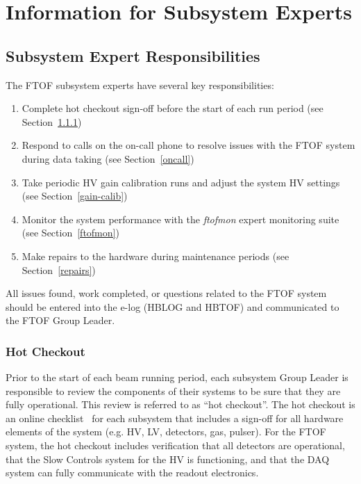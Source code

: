 \documentclass[12pt]{article}
\begin{document}
\clearpage

\vfil
\eject

\section{Information for Subsystem Experts}

\subsection{Subsystem Expert Responsibilities}

The FTOF subsystem experts have several key responsibilities:

\begin{enumerate}
\item Complete hot checkout sign-off before the start of each run period (see 
Section~\ref{checkout})
\item Respond to calls on the on-call phone to resolve issues with the FTOF system 
during data taking (see Section~\ref{oncall})
\item Take periodic HV gain calibration runs and adjust the system HV settings (see 
Section~\ref{gain-calib})
\item Monitor the system performance with the {\it ftofmon} expert monitoring suite
(see Section~\ref{ftofmon})
\item Make repairs to the hardware during maintenance periods (see Section~\ref{repairs})
\end{enumerate}

All issues found, work completed, or questions related to the FTOF system should be 
entered into the e-log (HBLOG and HBTOF) and communicated to the FTOF Group Leader.

\subsubsection{Hot Checkout}
\label{checkout}

Prior to the start of each beam running period, each subsystem Group Leader is 
responsible to review the components of their systems to be sure that they are fully 
operational. This review is referred to as ``hot checkout''. The hot checkout is an 
online checklist~\cite{hco-page} for each subsystem that includes a sign-off for all
hardware elements of the system (e.g. HV, LV, detectors, gas, pulser). For the FTOF
system, the hot checkout includes verification that all detectors are operational, that the
Slow Controls system for the HV is functioning, and that the DAQ system can fully
communicate with the readout electronics. 
\end{document}
